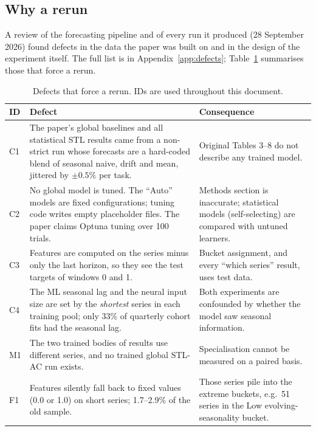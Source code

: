 \documentclass[11pt,a4paper]{article}
\begin{document}
\subsection{Why a rerun}

A review of the forecasting pipeline and of every run it produced (28 September 2026) found defects
in the data the paper was built on and in the design of the experiment itself. The full list is in
Appendix~\ref{app:defects}; Table~\ref{tab:defects-short} summarises those that force a rerun.

\begin{table}[h]
\centering\small
\caption{Defects that force a rerun. IDs are used throughout this document.}\label{tab:defects-short}
\begin{tabularx}{\linewidth}{@{}l X X@{}}
\toprule
ID & Defect & Consequence \\
\midrule
C1 & The paper's global baselines and all statistical STL results came from a non-strict run whose
forecasts are a hard-coded blend of seasonal naive, drift and mean, jittered by $\pm0.5\%$ per task.
& Original Tables 3--8 do not describe any trained model. \\
C2 & No global model is tuned. The ``Auto'' models are fixed configurations; tuning code writes empty
placeholder files. The paper claims Optuna tuning over 100 trials. & Methods section is inaccurate;
statistical models (self-selecting) are compared with untuned learners. \\
C3 & Features are computed on the series minus only the last horizon, so they see the test targets
of windows 0 and 1. & Bucket assignment, and every ``which series'' result, uses test data. \\
C4 & The ML seasonal lag and the neural input size are set by the \emph{shortest} series in each
training pool; only 33\% of quarterly cohort fits had the seasonal lag. & Both experiments are
confounded by whether the model saw seasonal information. \\
M1 & The two trained bodies of results use different series, and no trained global STL-AC run
exists. & Specialisation cannot be measured on a paired basis. \\
F1 & Features silently fall back to fixed values (0.0 or 1.0) on short series; 1.7--2.9\% of the
old sample. & Those series pile into the extreme buckets, e.g.\ 51 series in the Low
evolving-seasonality bucket. \\
\bottomrule
\end{tabularx}
\end{table}
\end{document}

